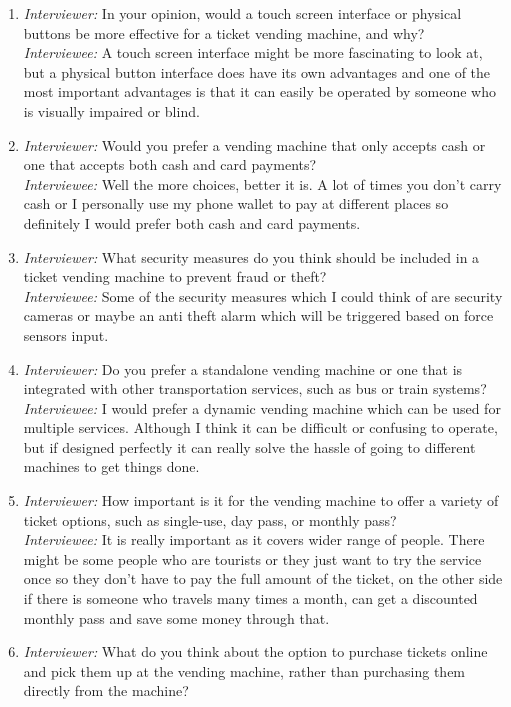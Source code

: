 \begin{enumerate}
    \item \emph{Interviewer:} In your opinion, would a touch screen interface or physical buttons be more effective for a ticket vending machine, and why?\\
\emph{Interviewee:} A touch screen interface might be more fascinating to look at, but a physical button interface does have its own advantages and one of the most important advantages is that it can easily be operated by someone who is visually impaired or blind.
    \item \emph{Interviewer:} Would you prefer a vending machine that only accepts cash or one that accepts both cash and card payments?\\
\emph{Interviewee:} Well the more choices, better it is. A lot of times you don't carry cash or I personally use my phone wallet to pay at different places so definitely I would prefer both cash and card payments.
    \item \emph{Interviewer:} What security measures do you think should be included in a ticket vending machine to prevent fraud or theft?\\
\emph{Interviewee:} Some of the security measures which I could think of are security cameras or maybe an anti theft alarm which will be triggered based on force sensors input.
    \item \emph{Interviewer:} Do you prefer a standalone vending machine or one that is integrated with other transportation services, such as bus or train systems?\\
\emph{Interviewee:} I would prefer a dynamic vending machine which can be used for multiple services. Although I think it can be difficult or confusing to operate, but if designed perfectly it can really solve the hassle of going to different machines to get things done.
    \item \emph{Interviewer:} How important is it for the vending machine to offer a variety of ticket options, such as single-use, day pass, or monthly pass?\\
\emph{Interviewee:} It is really important as it covers wider range of people. There might be some people who are tourists or they just want to try the service once so they don't have to pay the full amount of the ticket, on the other side if there is someone who travels many times a month, can get a discounted monthly pass and save some money through that.
    \item \emph{Interviewer:} What do you think about the option to purchase tickets online and pick them up at the vending machine, rather than purchasing them directly from the machine?\\

\end{enumerate}
